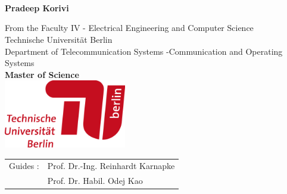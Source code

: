\begin{titlepage}
\begin{center}
\vspace*{2.0cm}
 \\
\vspace*{0.2cm}
 \\
\vspace*{0.2cm}
 \\
\vspace*{0.5cm}
\noindent \large {\bf Pradeep Korivi} \\
\vspace*{0.2cm}

\noindent \large {From the Faculty IV - Electrical Engineering and Computer Science} \\
\vspace*{0.2cm}
\noindent \large {Technische Universit{\"a}t Berlin} \\
\vspace*{0.2cm}
\noindent \large {Department of Telecommunication Systems -Communication and Operating Systems} \\
\vspace*{0.2cm}
\noindent \large {\bf Master of Science} \\
\vspace*{0.2cm}
\vspace{2cm}
{\includegraphics[width=0.4\textwidth]{Images/university.png}}
\vspace*{2cm}
~\\
\begin{tabular}{ll}
	\noindent \large{ Guides :}	& \noindent \large{Prof. Dr.-Ing. Reinhardt Karnapke}\\
      \vspace*{0.1cm}
    \noindent \large{}	& \noindent \large{Prof. Dr. Habil. Odej Kao}\\
     
	
\end{tabular}

\vspace*{1.5cm}

\end{center}
\end{titlepage}
\sloppy

\titlepage
